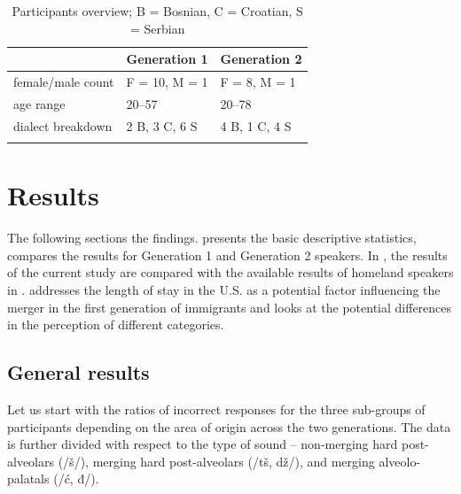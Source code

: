 \documentclass[output=paper,modfonts,newtxmath,hidelinks,]{langscibook}
\begin{document}
\begin{table}
\begin{tabularx}{\textwidth}{XXl}
\lsptoprule
&  \textbf{Generation 1} &  \textbf{Generation 2}\\
\midrule
female/male count & F = 10, M = 1 & F = 8, M = 1\\
age range & 20--57 & 20--78\\
dialect breakdown & 2 B, 3 C, 6 S & 4 B, 1 C, 4 S\\
\lspbottomrule
\end{tabularx}
\caption{\label{tab:mihajlovic:4} Participants overview; B = Bosnian, C = Croatian, S = Serbian}
\end{table}

\section{Results}\label{sec:mihajlovic:5}

The following sections  the findings.  presents the basic descriptive statistics,  compares the results for Generation 1 and Generation 2 speakers. In , the results of the current study are compared with the available results of homeland speakers in \citet{Cavar-Hamann2011}.  addresses the length of stay in the U.S. as a potential factor influencing the merger in the first generation of immigrants and  looks at the potential differences in the perception of different categories.


\subsection{General results}\label{sec:mihajlovic:5.1}

Let us start with the ratios of incorrect responses for the three sub-groups of participants depending on the area of origin across the two generations. The data is further divided with respect to the type of sound – non-merging hard post-alveolars (/š/), merging hard post-alveolars (/tš, dž/), and merging alveolo-palatals (/ć, đ/).
\end{document}
